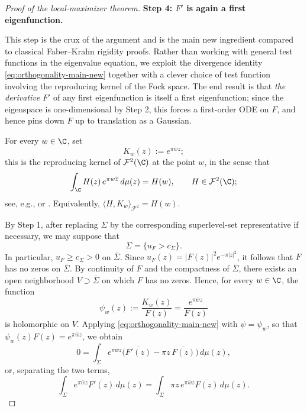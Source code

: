 \begin{proof}[Proof of the local-maximizer theorem]
\medskip
\noindent
{\bf Step 4: \(F'\) is again a first eigenfunction.}

This step is the crux of the argument and is the main new ingredient compared
to classical Faber--Krahn rigidity proofs. Rather than working with general
test functions in the eigenvalue equation, we exploit the divergence identity
\eqref{eq:orthogonality-main-new} together with a clever choice of test
function involving the reproducing kernel of the Fock space. The end result is
that \emph{the derivative} \(F'\) of any first eigenfunction is itself a first
eigenfunction; since the eigenspace is one-dimensional by Step 2, this forces
a first-order ODE on \(F\), and hence pins down \(F\) up to translation as a
Gaussian.

For every \(w\in \C\), set
\[
K_w(z):=e^{\pi \overline w z};
\]
this is the reproducing kernel of \(\mathcal F^2(\C)\) at the point \(w\), in
the sense that
\begin{equation}\label{eq:reproducing-kernel}
\int_\C H(z)\,e^{\pi w \overline z}\,d\mu(z)=H(w),
\qquad H\in\mathcal F^2(\C);
\end{equation}
see, e.g., \cite[Ch.~1]{Folland} or \cite{Bargmann}. Equivalently,
\(\langle H,K_w\rangle_{\mathcal F^2}=H(w)\).

By Step 1, after replacing \(\Sigma\) by the corresponding superlevel-set
representative if necessary, we may suppose that
\[
\Sigma=\{u_F>c_\Sigma\}.
\]
In particular, \(u_F\ge c_\Sigma>0\) on \(\overline \Sigma\). Since
\(u_F(z)=|F(z)|^2e^{-\pi |z|^2}\), it follows that \(F\) has no zeros on
\(\overline \Sigma\). By continuity of \(F\) and the compactness of
\(\overline \Sigma\), there exists an open neighborhood
\(V\supset \overline \Sigma\) on which \(F\) has no zeros. Hence, for every
\(w\in \C\), the function
\[
\psi_w(z):=\frac{K_w(z)}{F(z)}=\frac{e^{\pi\overline wz}}{F(z)}
\]
is holomorphic on \(V\). Applying \eqref{eq:orthogonality-main-new} with
\(\psi=\psi_w\), so that
\(\psi_w(z)F(z)=e^{\pi\overline w z}\), we obtain
\[
0=
\int_\Sigma
e^{\pi \overline wz}
\Big(\overline{F'(z)}-\pi z\,\overline{F(z)}\Big)\,d\mu(z),
\]
or, separating the two terms,
\begin{equation}\label{eq:key-kernel-identity-new}
\int_\Sigma
e^{\pi \overline wz}\overline{F'(z)}\,d\mu(z)
=
\int_\Sigma
\pi z\,e^{\pi \overline wz}\overline{F(z)}\,d\mu(z).
\end{equation}


\end{proof}
